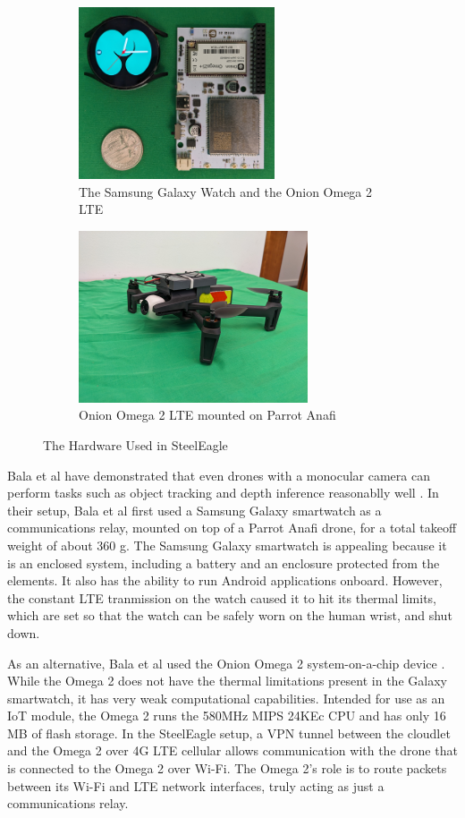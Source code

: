 \begin{figure}[htbp]
\centering
\begin{subfigure}[t]{0.45\textwidth}
\centering
\includegraphics[height=2in]{sec2023-figs/fig-omega-internals.jpg}
\caption{The Samsung Galaxy Watch and the Onion Omega 2 LTE}
\end{subfigure}
\begin{subfigure}[t]{0.45\textwidth}
\centering
\includegraphics[height=2in]{sec2023-figs/fig-omega-harness.jpg}
\caption{Onion Omega 2 LTE mounted on Parrot Anafi}
\end{subfigure}
\caption{The Hardware Used in SteelEagle}
\label{fig:galaxy_watch}
\end{figure}

Bala et al have demonstrated that even drones with a monocular camera can
perform tasks such as object tracking and depth inference reasonablly
well \cite{bala2024}. In their setup, Bala et al first used a Samsung
Galaxy smartwatch as a communications relay, mounted on top of a Parrot Anafi
drone, for a total takeoff weight of about 360 g. The Samsung Galaxy smartwatch
is appealing because it is an enclosed system, including a battery and an
enclosure protected from the elements. It also has the ability to run Android
applications onboard.  However, the constant LTE tranmission on the watch
caused it to hit its thermal limits, which are set so that the watch can be
safely worn on the human wrist, and shut down.

As an alternative, Bala et al used the Onion Omega 2 system-on-a-chip device
\cite{onionomega2}. While the Omega 2 does not have the thermal limitations
present in the Galaxy smartwatch, it has very weak computational capabilities.
Intended for use as an IoT module, the Omega 2 runs the 580MHz MIPS 24KEc CPU
and has only 16 MB of flash storage. In the SteelEagle setup, a VPN tunnel
between the cloudlet and the Omega 2 over 4G LTE cellular allows communication
with the drone that is connected to the Omega 2 over Wi-Fi. The Omega 2's role
is to route packets between its Wi-Fi and LTE network interfaces, truly acting
as just a communications relay.

